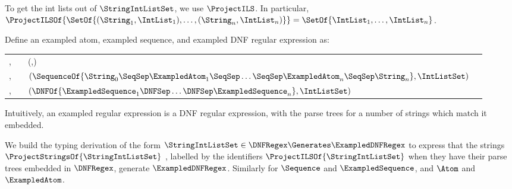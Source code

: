 \documentclass[acmsmall,screen]{acmart}
\begin{document}
\begin{definition}
  To get the int lists out of $\StringIntListSet$, we use $\ProjectILS$.  In
  particular,\\
  $\ProjectILSOf{\SetOf{(\String_1,\IntList_1),\ldots,(\String_n,\IntList_n)}}
  = \SetOf{\IntList_1,\ldots,\IntList_n}$.
\end{definition}

\begin{definition}
  Define an exampled atom, exampled sequence, and exampled DNF regular expression as:
  \begin{center}
    \begin{tabular}{l@{\ }c@{\ }l@{\ }>{\itshape\/}r}
      \ExampledAtom{},\ExampledAtomAlt{} & \GEq{} & (\StarOf{\ExampledDNFRegex{}},\IntListSet{})
      \\
      \ExampledSequence{},\ExampledSequenceAlt{} & \GEq{} &
                                                            $(\SequenceOf{\String_0\SeqSep\ExampledAtom_1\SeqSep\ldots\SeqSep\ExampledAtom_n\SeqSep\String_n},\IntListSet)$
      \\
      \ExampledDNFRegex{},\ExampledDNFRegexAlt{} & \GEq{} &
                                                            $(\DNFOf{\ExampledSequence_1\DNFSep\ldots\DNFSep\ExampledSequence_n},\IntListSet)$ %
    \end{tabular}
  \end{center}
\end{definition}

Intuitively, an exampled regular expression is a DNF regular expression, with the
parse trees for a number of strings which match it embedded.

We build the
typing derivation of the form
$\StringIntListSet \in \DNFRegex
\Generates \ExampledDNFRegex$ to express that the strings
$\ProjectStringsOf{\StringIntListSet}$
, labelled by the identifiers
$\ProjectILSOf{\StringIntListSet}$ when they have their parse trees embedded in
$\DNFRegex$, generate $\ExampledDNFRegex$.
Similarly for $\Sequence$ and $\ExampledSequence$, and $\Atom$ and
$\ExampledAtom$.
\end{document}
